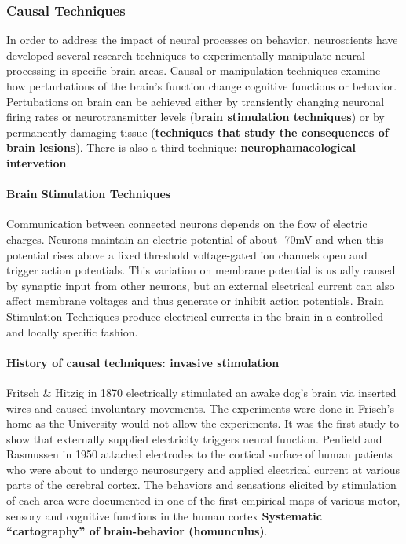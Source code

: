 \documentclass[12pt,article,oneside,a4paper]{memoir}
\begin{document}
\subsubsection{Causal Techniques}
In order to address the impact of neural processes on behavior, neuroscients
have developed several research techniques to experimentally manipulate neural
processing in specific brain areas. Causal or manipulation techniques examine
how perturbations of the brain's function change cognitive functions or
behavior. Pertubations on brain can be achieved either by transiently changing
neuronal firing rates or neurotransmitter levels (\textbf{brain stimulation
techniques}) or by permanently damaging tissue (\textbf{techniques that study
the consequences of brain lesions}). There is also a third technique:
\textbf{neurophamacological intervetion}.

\paragraph{Brain Stimulation Techniques}
Communication between connected neurons depends on the flow of electric
charges. Neurons maintain an electric potential of about -70mV and when this
potential rises above a fixed threshold voltage-gated ion channels open and
trigger action potentials. This variation on membrane potential is usually
caused by synaptic input from other neurons, but an external electrical current
can also affect membrane voltages and thus generate or inhibit action
potentials. Brain Stimulation Techniques produce electrical currents in the
brain in a controlled and locally specific fashion.

\paragraph{History of causal techniques: invasive stimulation}
Fritsch \& Hitzig in 1870 electrically stimulated an awake dog's brain via
inserted wires and caused involuntary movements. The experiments were done in
Frisch's home as the University would not allow the experiments. It was the
first study to show that externally supplied electricity triggers neural
function. Penfield and Rasmussen in 1950 attached electrodes to the cortical
surface of human patients who were about to undergo neurosurgery and applied
electrical current at various parts of the cerebral cortex. The behaviors and
sensations elicited by stimulation of each area were documented in one of the
first empirical maps of various motor, sensory and cognitive functions in the
human cortex \textbf{Systematic ``cartography'' of brain-behavior
(homunculus)}.
\end{document}

